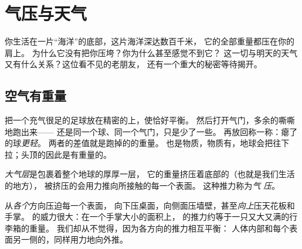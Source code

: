 \chapter{气压与天气}\label{ch:g5:air-pressure-weather}

你生活在一片“海洋”的底部，这片海洋深达数百千米，
它的全部重量都压在你的肩上。
为什么它没有把你压垮？你为什么甚至感觉不到它？
这一切与明天的天气又有什么关系？这位看不见的老朋友，
还有一个重大的秘密等待揭开。

\section{空气有重量}

\begin{example}[称一称看不见的东西]\label{ex:g5:air-pressure-weather:weighing}
把一个充气很足的足球放在精密的上，使恰好平衡。
然后打开气门，多余的嘶嘶地跑出来——
还是同一个球、同一个气门，只是少了一些。
再放回称一称：瘪了的球\emph{更轻}。
两者的差值就是跑掉的的重量。
也是物质，物质有，地球会把往下拉；头顶的因此是有重量的。
\end{example}

\begin{definition}[大气层与气压]\label{def:g5:air-pressure-weather:pressure}
\emph{大气层}是包裹着整个地球的厚厚一层，
它的重量挤压着底部的（也就是我们生活的地方），
被挤压的会用力推向所接触的每一个表面。
这种推力称为\emph{气
压}。
\end{definition}

\begin{proposition}[来自各方的推力]\label{prop:g5:air-pressure-weather:allsides}
从\emph{各个}方向压迫每一个表面，
向下压桌面，向侧面压墙壁，甚至\emph{向上}压天花板和手掌。
的威力很大：在一个手掌大小的面积上，
的推力约等于一只又大又满的行李箱的重量。
我们却从不觉得，因为各方向的推力相互平衡：
人体内部和每个表面另一侧的，同样用力地向外推。
\end{proposition}

